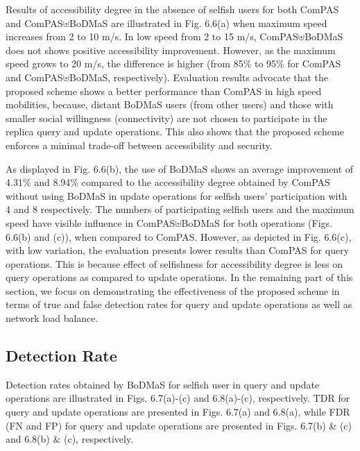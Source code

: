 Results of accessibility degree in the absence of selfish users for both ComPAS and ComPAS$\uplus$BoDMaS are illustrated in Fig. 6.6(a) when maximum speed increases from 2 to 10 m/s.  In low speed from 2 to 15 m/s, ComPAS$\uplus$BoDMaS does not shows positive accessibility improvement. However, as the maximum speed grows to 20 m/s, the difference is higher (from 85\% to 95\% for ComPAS and ComPAS$\uplus$BoDMaS, respectively). Evaluation results advocate that the proposed scheme shows a better performance than ComPAS in high speed mobilities, because, distant BoDMaS users (from other users) and those with smaller social willingness (connectivity) are not chosen to participate in the replica query and update operations. This also shows that the proposed scheme enforces a minimal trade-off between accessibility and security.

As displayed in Fig. 6.6(b), the use of BoDMaS shows an average improvement of 4.31\% and 8.94\% compared to the accessibility degree obtained by ComPAS without using BoDMaS in update operations for selfish users' participation with 4 and 8 respectively. The numbers of participating selfish users and the maximum speed have visible influence in ComPAS$\uplus$BoDMaS for both operations (Figs. 6.6(b) and (c)), when compared to ComPAS. However, as depicted in Fig. 6.6(c), with low variation, the evaluation presents lower results than ComPAS for query operations. This is because effect of selfishness for accessibility degree is less on query operations as compared to update operations. In the remaining part of this section, we focus on demonstrating the effectiveness of the proposed scheme in terms of true and false detection rates for query and update operations as well as network load balance.

\subsection{Detection Rate}\label{Chap6_05_02}
Detection rates obtained by BoDMaS for selfish user in query and update operations are illustrated in Figs. 6.7(a)-(c) and 6.8(a)-(c), respectively. TDR for query and update operations are presented in Figs. 6.7(a) and 6.8(a), while FDR (FN and FP) for query and update operations are presented in Figs. 6.7(b) \& (c) and 6.8(b) \& (c), respectively.

